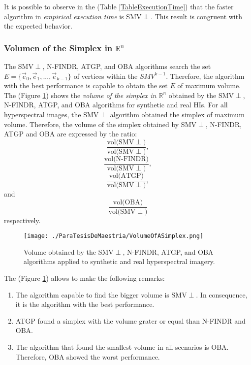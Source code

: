 \documentclass[11pt, oneside]{Thesis} %
\begin{document}
It is possible to observe in the (Table \ref{TableExecutionTime}) that the faster algorithm in 
\emph{empirical execution time} is SMV$\perp$. This result is congruent with the expected 
behavior.\\	

\subsubsection{Volumen of the Simplex in $\mathbb{R}^n$}

The SMV$\perp$, N-FINDR, ATGP, and OBA algorithms search the set 
$E=\lbrace \vec{e}_0, \vec{e}_1, ..., \vec{e}_{k-1} \rbrace$ of 
vertices within the $SMV^{k-1}$. Therefore, the algorithm with 
the best performance is capable to obtain the set $E$ of maximum 
volume.\\
	
The (Figure \ref{PhotoVolumeFound}) shows the 
\emph{volume of the simplex in $\mathbb{R}^n$} obtained by the SMV$\perp$, 
N-FINDR, ATGP, and OBA algorithms for synthetic and real HIs. For all 
hyperspectral images, the SMV$\perp$ algorithm obtained the simplex of maximum volume. 
Therefore, the volume of the simplex obtained by SMV$\perp$, N-FINDR, ATGP 
and OBA are expressed by the ratio: \[\frac{\text{vol(SMV}\perp)}{\text{vol(SMV}\perp)},\] 
\[\frac{\text{vol(N-FINDR)}}{\text{vol(SMV}\perp)},\] 
\[\frac{\text{vol(ATGP)}}{\text{vol(SMV}\perp)},\] and 
\[\frac{\text{vol(OBA)}}{\text{vol(SMV}\perp)}\] respectively.\\

\begin{figure}[ht]
  \centering
  \texttt{[image: ./ParaTesisDeMaestria/VolumeOfASimplex.png]}
  \centering
  \caption{Volume obtained by the SMV$\perp$, N-FINDR, ATGP, and OBA algorithms applied 
  to synthetic and real hyperspectral imagery.}
  \label{PhotoVolumeFound}
\end{figure}

The (Figure \ref{PhotoVolumeFound}) allows to make the following remarks:
\begin{enumerate}
  \item The algorithm capable to find the bigger volume is SMV$\perp$. In 
  consequence, it is the algorithm with the best performance.
  \item ATGP found a simplex with the volume grater or equal than N-FINDR and OBA.
  \item The algorithm that found the smallest volume in all scenarios is OBA. 
  Therefore, OBA showed the worst performance.
\end{enumerate}
\end{document}
